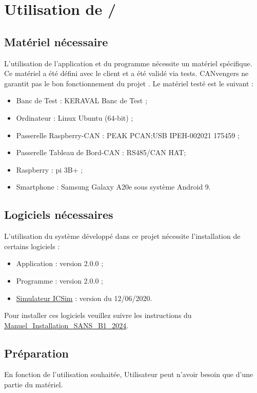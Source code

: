 %
%
\newpage %
\section{Utilisation de {\nomApplication}/{\nomLogiciel}}

\subsection{Matériel nécessaire}
L'utilisation de l'application {\nomApplication} et du programme {\nomLogiciel} nécessite un matériel spécifique. Ce matériel a été défini avec le client et a été validé via tests. CANvengers ne garantit pas le bon fonctionnement du projet {\guillemetleft} {\projectName} {\guillemetright}. Le matériel testé est le suivant :
\begin{itemize}
    \item Banc de Test : KERAVAL Banc de Test ;
    \item Ordinateur : Linux Ubuntu (64-bit) ;
    \item Passerelle Raspberry-CAN : PEAK PCAN;USB IPEH-002021 175459 ;
    \item Passerelle Tableau de Bord-CAN : RS485/CAN HAT;
    \item Raspberry : pi 3B+ ;
    \item Smartphone : Samsung Galaxy A20e sous système Android 9.
\end{itemize}

\subsection{Logiciels nécessaires}
L'utilisation du système développé dans ce projet nécessite l'installation de certains logiciels :
\begin{itemize}
    \item Application {\nomApplication} : version 2.0.0 ;
    \item Programme {\nomLogiciel} : version 2.0.0 ;
    \item \hyperref[ICSim]{Simulateur ICSim} : version du 12/06/2020.
\end{itemize}
Pour installer ces logiciels veuillez suivre les instructions du \hyperref[INST]{Manuel\_Installation\_SANS\_B1\_2024}.\\

\subsection{Préparation}
En fonction de l'utilisation souhaitée, Utilisateur peut n'avoir besoin que d'une partie du matériel.

